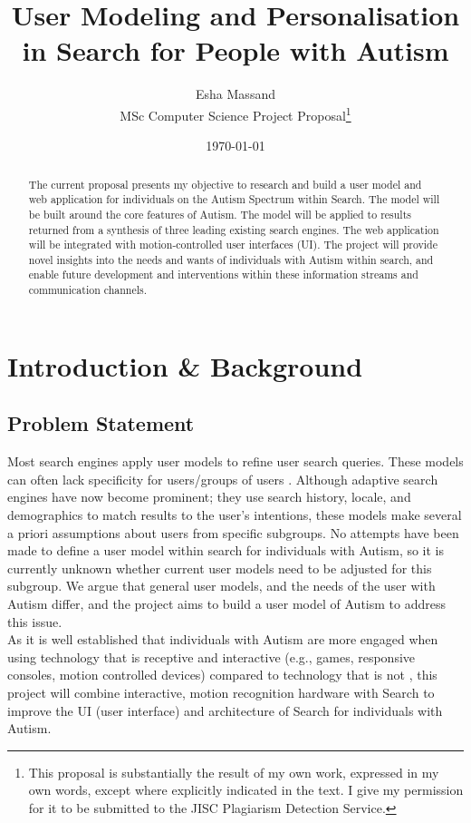 \documentclass[10pt]{article}
\begin{document}
\title{User Modeling and Personalisation in Search for People with Autism}
\author{Esha Massand\\
MSc Computer Science Project Proposal\footnote{This proposal is substantially the result of my own work, expressed in my own words, except where explicitly indicated in the text. I give my permission for it to be submitted to the JISC Plagiarism Detection Service. }}
\date{\today}
\maketitle

\begin{abstract}
The current proposal presents my objective to research and build a user model and web application for individuals on the Autism Spectrum within Search. The model will be built around the core features of Autism. The model will be applied to results returned from a synthesis of three leading existing search engines. The web application will be integrated with motion-controlled user interfaces (UI). The project will provide novel insights into the needs and wants of individuals with Autism within search, and enable future development and interventions within these information streams and communication channels.
\end{abstract}

\tableofcontents

\section{Introduction \& Background}
\subsection{Problem Statement} \label{prob}
Most search engines apply user models to refine user search queries. These models can often lack specificity for users/groups of users \cite{usermodel}. Although adaptive search engines have now become prominent; they use search history, locale, and demographics to match results to the user's intentions, these models make several a priori assumptions about users from specific subgroups. No attempts have been made to define a user model within search for individuals with Autism, so it is currently unknown whether current user models need to be adjusted for this subgroup. We argue that general user models, and the needs of the user with Autism differ, and the project aims to build a user model of Autism to address this issue.\\
As it is well established that individuals with Autism are more engaged when using technology that is receptive and interactive (e.g., games, responsive consoles, motion controlled devices) compared to technology that is not \cite{motioncontrollerforautism}, this project will combine interactive, motion recognition hardware with Search to improve the UI (user interface) and architecture of Search for individuals with Autism.
\end{document}
